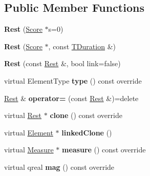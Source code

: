 \subsection*{Public Member Functions}
\begin{DoxyCompactItemize}
\item 
\mbox{\label{class_ms_1_1_rest_a04b632f9669923490c6e0555a5e1bd77}} 
{\bfseries Rest} (\hyperlink{class_ms_1_1_score}{Score} $\ast$s=0)
\item 
\mbox{\label{class_ms_1_1_rest_a91d5e078d8819c61c0080af60bdd480f}} 
{\bfseries Rest} (\hyperlink{class_ms_1_1_score}{Score} $\ast$, const \hyperlink{class_ms_1_1_t_duration}{T\+Duration} \&)
\item 
\mbox{\label{class_ms_1_1_rest_a253a14b799a94c5a97fbf18a2522f6ea}} 
{\bfseries Rest} (const \hyperlink{class_ms_1_1_rest}{Rest} \&, bool link=false)
\item 
\mbox{\label{class_ms_1_1_rest_ae07eddac0e07e5cbba19b31f808c2a09}} 
virtual Element\+Type {\bfseries type} () const override
\item 
\mbox{\label{class_ms_1_1_rest_a84d14ea0bfd53b05bb6b24a83b38f97d}} 
\hyperlink{class_ms_1_1_rest}{Rest} \& {\bfseries operator=} (const \hyperlink{class_ms_1_1_rest}{Rest} \&)=delete
\item 
\mbox{\label{class_ms_1_1_rest_a1b2a792d58401fad8b8a6d7f93d0838b}} 
virtual \hyperlink{class_ms_1_1_rest}{Rest} $\ast$ {\bfseries clone} () const override
\item 
\mbox{\label{class_ms_1_1_rest_a622a8a43b3161634678985bc86eafb9c}} 
virtual \hyperlink{class_ms_1_1_element}{Element} $\ast$ {\bfseries linked\+Clone} ()
\item 
\mbox{\label{class_ms_1_1_rest_a745213edf716cf4d102d8431e2538e92}} 
virtual \hyperlink{class_ms_1_1_measure}{Measure} $\ast$ {\bfseries measure} () const override
\item 
\mbox{\label{class_ms_1_1_rest_a68c0961e9f5d636710a2cfc34bdd1f5c}} 
virtual qreal {\bfseries mag} () const override

\end{DoxyCompactItemize}
